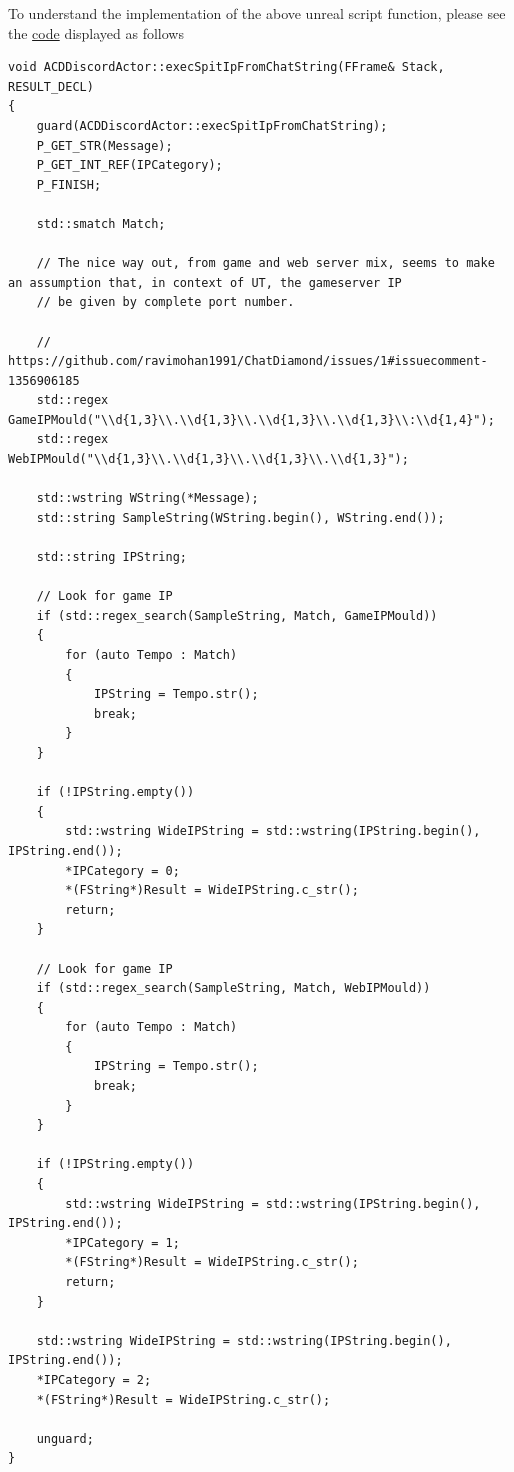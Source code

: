 \documentclass{article}
\theoremstyle{definition}
\begin{document}
To understand the implementation of the above unreal script function, please see the \href{https://github.com/ravimohan1991/ChatDiamond/blob/6e3b684403fb75811c1cde6372c9125370bc796a/UTNativeEssentials/ChatDiamond/Src/ChatDiamondNative.cpp#L52}{code} displayed as follows

\lstset{language=C++}
\begin{lstlisting}[frame=single]
void ACDDiscordActor::execSpitIpFromChatString(FFrame& Stack, RESULT_DECL)
{
	guard(ACDDiscordActor::execSpitIpFromChatString);
	P_GET_STR(Message);
	P_GET_INT_REF(IPCategory);
	P_FINISH;

	std::smatch Match;

	// The nice way out, from game and web server mix, seems to make an assumption that, in context of UT, the gameserver IP
	// be given by complete port number.

	// https://github.com/ravimohan1991/ChatDiamond/issues/1#issuecomment-1356906185
	std::regex GameIPMould("\\d{1,3}\\.\\d{1,3}\\.\\d{1,3}\\.\\d{1,3}\\:\\d{1,4}");
	std::regex WebIPMould("\\d{1,3}\\.\\d{1,3}\\.\\d{1,3}\\.\\d{1,3}");

	std::wstring WString(*Message);
	std::string SampleString(WString.begin(), WString.end());

	std::string IPString;

	// Look for game IP
	if (std::regex_search(SampleString, Match, GameIPMould))
	{
		for (auto Tempo : Match)
		{
			IPString = Tempo.str();
			break;
		}
	}

	if (!IPString.empty())
	{
		std::wstring WideIPString = std::wstring(IPString.begin(), IPString.end());
		*IPCategory = 0;
		*(FString*)Result = WideIPString.c_str();
		return;
	}

	// Look for game IP
	if (std::regex_search(SampleString, Match, WebIPMould))
	{
		for (auto Tempo : Match)
		{
			IPString = Tempo.str();
			break;
		}
	}

	if (!IPString.empty())
	{
		std::wstring WideIPString = std::wstring(IPString.begin(), IPString.end());
		*IPCategory = 1;
		*(FString*)Result = WideIPString.c_str();
		return;
	}

	std::wstring WideIPString = std::wstring(IPString.begin(), IPString.end());
	*IPCategory = 2;
	*(FString*)Result = WideIPString.c_str();

	unguard;
}
\end{lstlisting}
\end{document}
